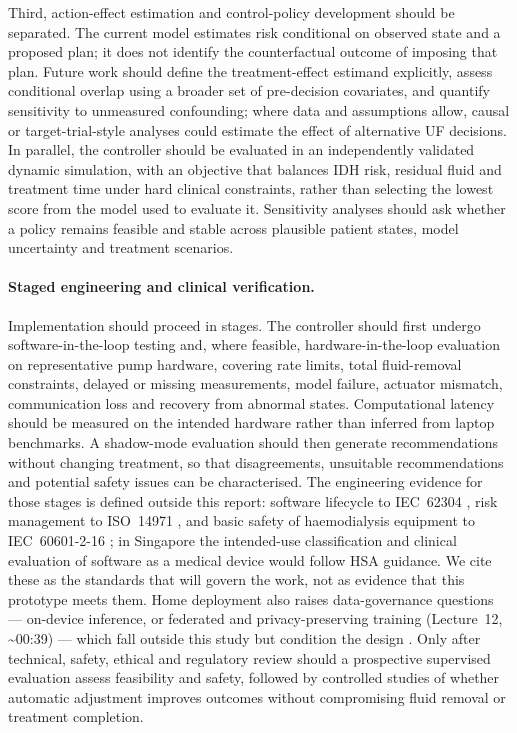 \documentclass{article}
\begin{document}
Third, action-effect estimation and control-policy development should be separated. The current model estimates risk
conditional on observed state and a proposed plan; it does not identify the counterfactual outcome of imposing that plan.
Future work should define the treatment-effect estimand explicitly, assess conditional overlap using a broader set of
pre-decision covariates, and quantify sensitivity to unmeasured confounding; where data and assumptions allow, causal or
target-trial-style analyses could estimate the effect of alternative UF decisions. In parallel, the controller should be
evaluated in an independently validated dynamic simulation, with an objective that balances IDH risk, residual fluid and
treatment time under hard clinical constraints, rather than selecting the lowest score from the model used to evaluate it.
Sensitivity analyses should ask whether a policy remains feasible and stable across plausible patient states, model
uncertainty and treatment scenarios.

\paragraph{Staged engineering and clinical verification.} Implementation should proceed in stages. The controller should first
undergo software-in-the-loop testing and, where feasible, hardware-in-the-loop evaluation on representative pump hardware,
covering rate limits, total fluid-removal constraints, delayed or missing measurements, model failure, actuator mismatch,
communication loss and recovery from abnormal states. Computational latency should be measured on the intended hardware rather
than inferred from laptop benchmarks. A shadow-mode evaluation should then generate recommendations without changing treatment,
so that disagreements, unsuitable recommendations and potential safety issues can be characterised. The engineering evidence for those stages is defined outside this report: software lifecycle to IEC~62304
\citep{iec62304}, risk management to ISO~14971 \citep{iso14971}, and basic safety of haemodialysis equipment to
IEC~60601-2-16 \citep{iec60601_2_16}; in Singapore the intended-use classification and clinical evaluation of software as a
medical device would follow HSA guidance. We cite these as the standards that will govern the work, not as evidence that this
prototype meets them. Home deployment also raises data-governance questions --- on-device inference, or federated and privacy-preserving training
(Lecture~12, \textasciitilde 00:39) --- which fall outside this study but condition the design \citep{md6329lectures}. Only
after technical, safety, ethical and regulatory review should a prospective supervised evaluation assess feasibility and
safety, followed by
controlled studies of whether automatic adjustment improves outcomes without compromising fluid removal or treatment
completion.
\end{document}
